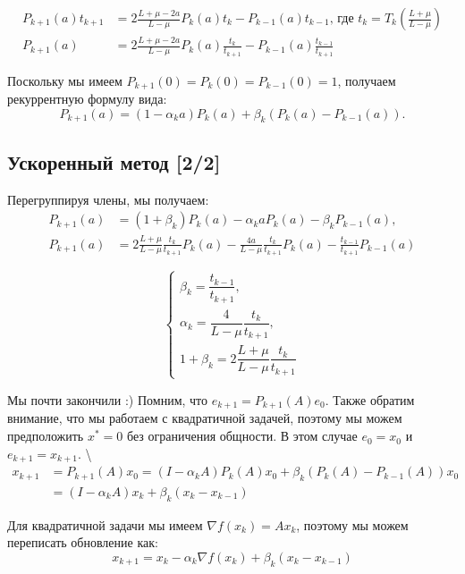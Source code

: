 \documentclass[
  russian,
  letterpaper,
  DIV=11,
  numbers=noendperiod]{scrartcl}
\begin{document}
\[
\begin{aligned}
P_{k+1}(a) t_{k+1} &= 2 \frac{L+\mu-2a}{L-\mu} P_{k}(a) t_{k} - P_{k-1}(a) t_{k-1} \text{, где } t_{k} = T_{k}\left(\frac{L+\mu}{L-\mu}\right) \\
P_{k+1}(a) &= 2 \frac{L+\mu-2a}{L-\mu} P_{k}(a) \frac{t_{k}}{t_{k+1}} - P_{k-1}(a) \frac{t_{k-1}}{t_{k+1}}
\end{aligned}
\]

Поскольку мы имеем \(P_{k+1}(0) = P_{k}(0) = P_{k-1}(0) = 1\), получаем
рекуррентную формулу вида: \[
P_{k+1}(a) = (1 - \alpha_k a) P_k(a) + \beta_k \left(P_{k}(a) - P_{k-1}(a) \right).
\]

\subsection{Ускоренный метод
{[}2/2{]}}\label{ux443ux441ux43aux43eux440ux435ux43dux43dux44bux439-ux43cux435ux442ux43eux434-22}

Перегруппируя члены, мы получаем: \[
\begin{aligned}
P_{k+1}(a) &= (1 + \beta_k) P_k(a) - \alpha_k a P_k(a) - \beta_k P_{k-1}(a), \\
P_{k+1}(a) &= 2 \frac{L+\mu}{L-\mu}  \frac{t_{k}}{t_{k+1}} P_{k}(a) - \frac{4a}{L-\mu}  \frac{t_{k}}{t_{k+1}}P_{k}(a) - \frac{t_{k-1}}{t_{k+1}} P_{k-1}(a)
\end{aligned}
\]

\[
\begin{cases}
\beta_k = \dfrac{t_{k-1}}{t_{k+1}}, \\[6pt]
\alpha_k = \dfrac{4}{L-\mu} \dfrac{t_k}{t_{k+1}}, \\[6pt]
1 + \beta_k = 2 \dfrac{L + \mu}{L - \mu} \dfrac{t_k}{t_{k+1}}
\end{cases}
\]

Мы почти закончили :) Помним, что \(e_{k+1} = P_{k+1}(A) e_0\). Также
обратим внимание, что мы работаем с квадратичной задачей, поэтому мы
можем предположить \(x^* = 0\) без ограничения общности. В этом случае
\(e_0 = x_0\) и \(e_{k+1} = x_{k+1}\). \textbackslash{} \[
\begin{aligned}
x_{k+1} &= P_{k+1}(A) x_0 =  (I - \alpha_k A) P_k(A) x_0 + \beta_k \left(P_{k}(A) - P_{k-1}(A) \right) x_0 \\
&= (I - \alpha_k A) x_k + \beta_k \left(x_k - x_{k-1}\right)
\end{aligned}
\]

Для квадратичной задачи мы имеем \(\nabla f(x_k) = A x_k\), поэтому мы
можем переписать обновление как: \[
\boxed{
x_{k+1} = x_k - \alpha_k \nabla f(x_k) + \beta_k \left(x_k - x_{k-1}\right)
}
\]
\end{document}
